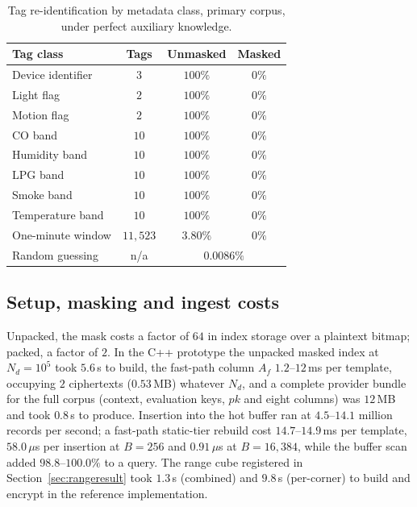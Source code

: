 \documentclass[a4paper,fleqn]{cas-sc}
\newif\ifauthorchecks
\newcommand{\authorcheck}[1]{\ifauthorchecks{\color{red}\textsf{[Authors: #1]}}\fi}
\begin{document}
\begin{table}[pos=htbp]
\caption{Tag re-identification by metadata class, primary corpus, under
perfect auxiliary knowledge.}
\label{tab:leakage}
\centering
\footnotesize
\setlength{\tabcolsep}{3pt}
\renewcommand{\arraystretch}{1.15}
\begin{tabular*}{\tblwidth}{@{\extracolsep{\fill}}lccc@{}}
\toprule
Tag class & Tags & Unmasked & Masked \\
\midrule
Device identifier      & $3$      & $100\%$ & $0\%$ \\
Light flag             & $2$      & $100\%$ & $0\%$ \\
Motion flag            & $2$      & $100\%$ & $0\%$ \\
CO band                & $10$     & $100\%$ & $0\%$ \\
Humidity band          & $10$     & $100\%$ & $0\%$ \\
LPG band               & $10$     & $100\%$ & $0\%$ \\
Smoke band             & $10$     & $100\%$ & $0\%$ \\
Temperature band       & $10$     & $100\%$ & $0\%$ \\
One-minute window      & $11{,}523$ & $3.80\%$ & $0\%$ \\
\midrule
Random guessing        & n/a      & \multicolumn{2}{c}{$0.0086\%$} \\
\bottomrule
\end{tabular*}
\end{table}

\subsection{Setup, masking and ingest costs}
\label{sec:setupresult}
Unpacked, the mask costs a factor of $64$ in index storage over a plaintext
bitmap; packed, a factor of $2$. In the C++ prototype the unpacked masked index
at $N_d=10^5$ took $5.6$\,s to build, the fast-path column $A_f$ $1.2$--$12$\,ms
per template, occupying $2$ ciphertexts ($0.53$\,MB) whatever $N_d$, and a
complete provider bundle for the full corpus (context, evaluation keys, $pk$
and eight columns) was $12$\,MB and took $0.8$\,s to produce. Insertion into the hot
buffer ran at $4.5$--$14.1$ million records per second; a fast-path static-tier
rebuild cost $14.7$--$14.9$\,ms per template, $58.0\,\mu$s per insertion at
$B=256$ and $0.91\,\mu$s at $B=16{,}384$, while the buffer scan added
$98.8$--$100.0\%$ to a query. The range cube registered in
Section~\ref{sec:rangeresult} took $1.3$\,s (combined) and $9.8$\,s
(per-corner) to build and encrypt in the reference implementation.
\authorcheck{Re-measure the masked-index build with rejection sampling and
packing in C++.}
\end{document}
